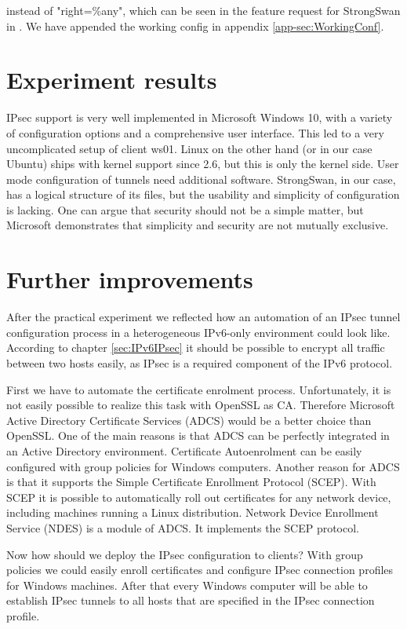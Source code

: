 \documentclass[a4paper]{report}
\begin{document}
instead of "right=\%any", which can be seen in the feature request for StrongSwan in \cite{Brunner2012}. We have appended the working config in appendix \ref{app-sec:WorkingConf}.

\section{Experiment results}
\label{sec:ExpRes}
IPsec support is very well implemented in Microsoft Windows 10, with a variety of configuration options and a comprehensive user interface. This led to a very uncomplicated setup of client ws01. Linux on the other hand (or in our case Ubuntu) ships with kernel support since 2.6, but this is only the kernel side. User mode configuration of tunnels need additional software. StrongSwan, in our case, has a logical structure of its files, but the usability and simplicity of configuration is lacking. One can argue that security should not be a simple matter, but Microsoft demonstrates that simplicity and security are not mutually exclusive. 

\section{Further improvements}
After the practical experiment we reflected how an automation of an IPsec tunnel configuration process in a heterogeneous IPv6-only environment could look like. 
According to chapter \ref{sec:IPv6IPsec} it should be possible to encrypt all traffic between two hosts easily, as IPsec is a required component of the IPv6 protocol.

First we have to automate the certificate enrolment process. Unfortunately, it is not easily possible to realize this task with OpenSSL as CA. 
Therefore Microsoft Active Directory Certificate Services (ADCS) would be a better choice than OpenSSL. 
One of the main reasons is that ADCS can be perfectly integrated in an Active Directory environment. Certificate Autoenrolment can be easily configured with group policies for Windows computers. 
Another reason for ADCS is that it supports the Simple Certificate Enrollment Protocol (SCEP).
With SCEP it is possible to automatically roll out certificates for any network device, including machines running a Linux distribution. 
Network Device Enrollment Service (NDES) is a module of ADCS. It implements the SCEP protocol. 

Now how should we deploy the IPsec configuration to clients? With group policies we could easily enroll certificates and configure IPsec connection profiles for Windows machines. 
After that every Windows computer will be able to establish IPsec tunnels to all hosts that are specified in the IPsec connection profile.
\end{document}
